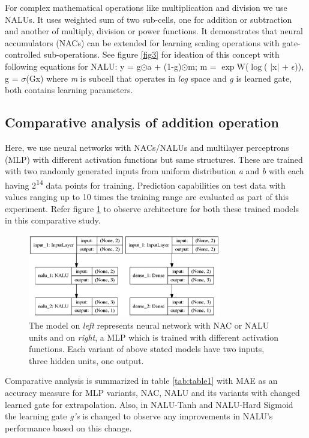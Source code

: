 \documentclass[runningheads]{llncs}
\begin{document}
For complex mathematical operations like multiplication and division we use NALUs. It uses weighted sum of two sub-cells, one for addition or subtraction and another of multiply, division or power functions. It demonstrates that neural accumulators (NACs) can be extended for learning scaling operations with gate-controlled sub-operations. See figure \ref{fig3} for ideation of this concept with following equations for NALU: y = g$\odot$a + (1-g)$\odot$m; m = $\exp$W($\log$( $\mid$x$\mid$ + $\epsilon$)), g = $\sigma$(Gx) where \textit{m} is subcell that operates in \textit{log} space and \textit{g} is learned gate, both contains learning parameters.

\subsection{Comparative analysis of addition operation}

Here, we use neural networks with NACs/NALUs and multilayer perceptrons (MLP) with different activation functions but same structures. These are trained with two randomly generated inputs from uniform distribution \textit{a} and \textit{b} with each having 2\textsuperscript{14} data points for training. Prediction capabilities on test data with values ranging up to 10 times the training range are evaluated as part of this experiment. Refer figure \ref{fig4} to observe architecture for both these trained models in this comparative study.

\begin{figure}[!h]
\centering
\includegraphics[width=0.75\textwidth]{mlp-models.png}
\caption{The model on \textit{left} represents neural network with NAC or NALU units and on \textit{right}, a MLP which is trained with different activation functions. Each variant of above stated models have two inputs, three hidden units, one output.}
\label{fig4}
\end{figure}

Comparative analysis is summarized in table  \ref{tab:table1} with MAE as an accuracy measure for MLP variants, NAC, NALU and its variants with changed learned gate for extrapolation. Also, in NALU-Tanh and NALU-Hard Sigmoid the learning gate \textit{g's} is changed to observe any improvements in NALU's performance based on this change.
\end{document}
